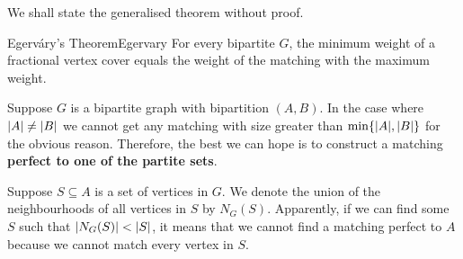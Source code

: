 \documentclass[math]{amznotes}
\theoremstyle{remark}
\begin{document}
We shall state the generalised theorem without proof.
\begin{thmbox}{Egerv\'{a}ry's Theorem}{Egervary}
    For every bipartite $G$, the minimum weight of a fractional vertex cover equals the weight of the matching with the maximum weight.
\end{thmbox}
Suppose $G$ is a bipartite graph with bipartition $(A, B)$. In the case where ${\left\lvert {A} \right\rvert} \neq {\left\lvert {B} \right\rvert}$ we cannot get any matching with size greater than $\min\{{\left\lvert {A} \right\rvert}, {\left\lvert {B} \right\rvert}\}$ for the obvious reason. Therefore, the best we can hope is to construct a matching \textbf{perfect to one of the partite sets}.

Suppose $S \subseteq A$ is a set of vertices in $G$. We denote the union of the neighbourhoods of all vertices in $S$ by $N_G(S)$. Apparently, if we can find some $S$ such that ${\left\lvert {N_G(S)} \right\rvert} < {\left\lvert {S} \right\rvert}$, it means that we cannot find a matching perfect to $A$ because we cannot match every vertex in $S$.
\end{document}
